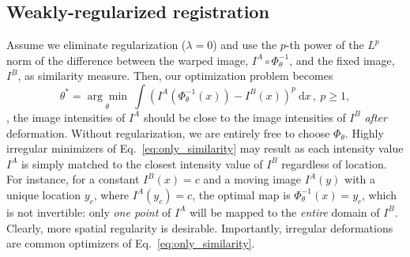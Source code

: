 \documentclass[10pt,twocolumn,letterpaper]{article} %
\begin{document}
\subsection{Weakly-regularized registration}
\label{subsection:regularization_thoughts_and_sorting}

Assume we eliminate regularization ($\lambda=0$) and use the $p$-th power of the $L^p$ norm of the difference between the warped image, $I^A\circ\Phi_\theta^{-1}$, and the fixed image, $I^B$, as similarity measure. Then, our optimization problem becomes
\begin{equation}
  \theta^* = \underset{\theta}{\arg \min}~\int (I^A(\Phi_\theta^{-1}(x))-I^B(x))^p~\mathrm{d}x\,,~p\geq 1, \label{eq:only_similarity}
\end{equation}
\ie, the image intensities of $I^A$ should be close to the image intensities of $I^B$ \emph{after} deformation. Without regularization, we are entirely free to choose $\Phi_\theta$. Highly irregular minimizers of Eq.~\eqref{eq:only_similarity} may result as each intensity value $I^A$ is simply matched to the closest intensity value of $I^B$ regardless of location. For instance, for a constant $I^B(x)=c$ and a moving image $I^A(y)$ with a unique location $y_c$, where $I^A(y_c)=c$, the optimal map is $\Phi_\theta^{-1}(x) = y_c$, which  is not invertible: only \emph{one point} of $I^A$ will be mapped to the \emph{entire} domain of $I^B$. Clearly, more spatial regularity is desirable. Importantly, irregular deformations are common optimizers of Eq.~\eqref{eq:only_similarity}. 
\end{document}
